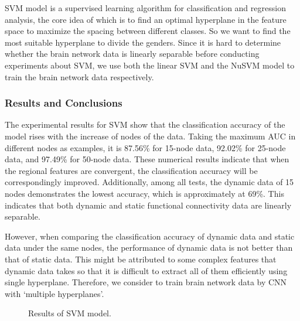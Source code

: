 \documentclass[11pt]{article}
\begin{document}
SVM model \cite{Vapnik1997-yy}\cite{Cortes1995-dg} is a supervised learning algorithm for classification and regression analysis, the core idea of which is to find an optimal hyperplane in the feature space to maximize the spacing between different classes. So we want to find the most suitable hyperplane to divide the genders.
Since it is hard to determine whether the brain network data is linearly separable before conducting experiments about SVM, we use both the linear SVM and the NuSVM model to train the brain network data respectively.

\subsubsection{Results and Conclusions}

The experimental results for SVM show that the classification accuracy of the model rises with the increase of nodes of the data. Taking the maximum AUC in different nodes as examples, it is 87.56\% for 15-node data, 92.02\% for 25-node data, and 97.49\% for 50-node data. These numerical results indicate that when the regional features are convergent, the classification accuracy will be correspondingly improved. Additionally, among all tests, the dynamic data of 15 nodes demonstrates the lowest accuracy, which is approximately at 69\%. This indicates that both dynamic and static functional connectivity data are linearly separable.

However, when comparing the classification accuracy of dynamic data and static data under the same nodes, the performance of dynamic data is not better than that of static data. This might be attributed to some complex features that dynamic data takes so that it is difficult to extract all of them efficiently using single hyperplane. Therefore, we consider to train brain network data by CNN with `multiple hyperplanes'.

\begin{figure}[H]
    \centering
    \caption{Results of SVM model.}
    \label{svm-results}
\end{figure}
\end{document}
